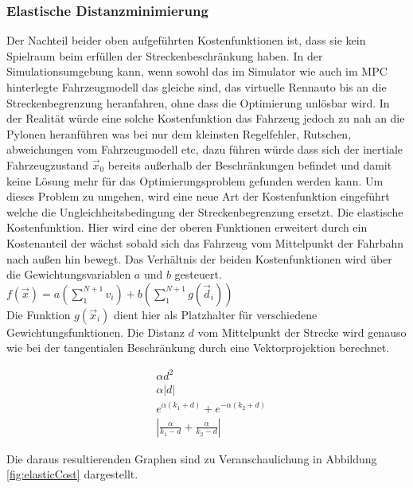 \documentclass{like}
\begin{document}
\subsubsection*{Elastische Distanzminimierung}
Der Nachteil beider oben aufgeführten Kostenfunktionen ist, dass sie kein Spielraum beim erfüllen der Streckenbeschränkung haben. In der Simulationsumgebung kann, wenn sowohl das im Simulator wie auch im \ac{MPC} hinterlegte Fahrzeugmodell das gleiche sind, das virtuelle Rennauto bis an die Streckenbegrenzung heranfahren, ohne dass die Optimierung unlösbar wird. In der Realität würde eine solche Kostenfunktion das Fahrzeug jedoch zu nah an die Pylonen heranführen was bei nur dem kleinsten Regelfehler, Rutschen, abweichungen vom Fahrzeugmodell etc, dazu führen würde dass sich der inertiale Fahrzeugzustand $\vec{x}_0$ bereits außerhalb der Beschränkungen befindet und damit keine Lösung mehr für das Optimierungsproblem gefunden werden kann. Um dieses Problem zu umgehen, wird eine neue Art der Kostenfunktion eingeführt welche die Ungleichheitsbedingung der Streckenbegrenzung ersetzt. Die elastische Kostenfunktion. Hier wird eine der oberen Funktionen erweitert durch ein Kostenanteil der wächst sobald sich das Fahrzeug vom Mittelpunkt der Fahrbahn nach außen hin bewegt. Das Verhältnis der beiden Kostenfunktionen wird über die Gewichtungsvariablen \(a\) und \(b\) gesteuert.\\
$f(\vec{x}) = a (\sum_{1}^{N+1} v_i) + b(\sum_{1}^{N+1} g(\vec{d}_i))$  \\
Die Funktion $g(\vec{x}_i)$ dient hier als Platzhalter für verschiedene Gewichtungsfunktionen. Die Distanz \(d\) vom Mittelpunkt der Strecke wird genauso wie bei der tangentialen Beschränkung durch eine Vektorprojektion berechnet.

\begin{eqnarray}
	&\alpha d^2 \\
	&\alpha |d|\\
	&e^{\alpha (k_1 + d)} + e^{-\alpha(k_2 + d)} \label{eq:distMeasure1}\\
	&|\frac{\alpha}{k_1-d} + \frac{\alpha}{k_2 - d}| \label{eq:distMeasure2}
\end{eqnarray}

Die daraus resultierenden Graphen sind zu Veranschaulichung in Abbildung \ref{fig:elasticCost} dargestellt.
\end{document}
